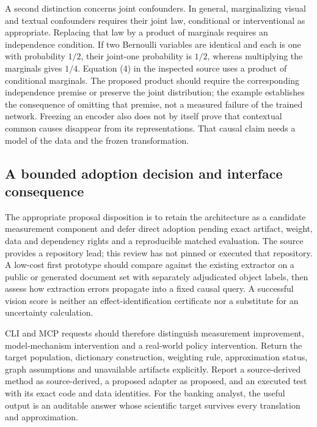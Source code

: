 A second distinction concerns joint confounders. In general, marginalizing visual and textual confounders requires their
joint law, conditional or interventional as appropriate. Replacing that law by a product of marginals requires an independence
condition. If two Bernoulli variables are identical and each is one with probability \(1/2\), their joint-one probability is
\(1/2\), whereas multiplying the marginals gives \(1/4\). Equation (4) in the inspected source uses a product of conditional
marginals. The proposed product should require the corresponding independence premise or preserve the joint distribution;
the example establishes the consequence of omitting that premise, not a measured failure of the trained network.
Freezing an encoder also does not by itself prove that contextual common causes disappear from its representations.
That causal claim needs a model of the data and the frozen transformation.~\citep{exec28_fr_hu,exec28_fr_reference}

\subsection{A bounded adoption decision and interface consequence}
The appropriate proposal disposition is to retain the architecture as a candidate measurement component and defer direct
adoption pending exact artifact, weight, data and dependency rights and a reproducible matched evaluation. The source provides
a repository lead; this review has not pinned or executed that repository. A low-cost first prototype should compare against
the existing extractor on a public or generated document set with separately adjudicated object labels, then assess how
extraction errors propagate into a fixed causal query. A successful vision score is neither an effect-identification certificate
nor a substitute for an uncertainty calculation.

CLI and MCP requests should therefore distinguish measurement improvement, model-mechanism intervention and a real-world
policy intervention. Return the target population, dictionary construction, weighting rule, approximation status, graph
assumptions and unavailable artifacts explicitly. Report a source-derived method as source-derived, a proposed adapter as
proposed, and an executed test with its exact code and data identities. For the banking analyst, the useful output is an
auditable answer whose scientific target survives every translation and approximation.



